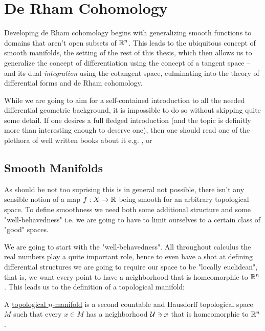 \chapter{De Rham Cohomology}
Developing de Rham cohomology begins with generalizing smooth functions to domains
that aren't open subsets of $\mathbb{R}^n$. This leads to the ubiquitous concept of smooth
manifolds, the setting of the rest of this thesis, which then allows us to generalize
the concept of differentiation using the concept of a tangent space – and its dual
\textit{integration} using the cotangent space, culminating into the theory of differential forms
and de Rham cohomology.

\begin{remark}
While we are going to aim for a self-contained introduction to all the needed differential geometric
background, it is impossible to do so without skipping quite some detail. If one desires a full fledged
introduction (and the topic is definitly more than interesting enough to deserve one), then one should read
one of the plethora of well written books about it e.g. \cite{lee_introduction_2013}, \cite{spivak_comprehensive_1979}
or \cite{wendl_differential_2022}
\end{remark}

\section{Smooth Manifolds}
As should be not too suprising this is in general not possible, there isn't any sensible notion
of a map $f: X \to \mathbb{R}$ being smooth for an arbitrary topological space. To define smoothness
we need both some additional structure and some "well-behavedness" i.e. we are going to have to
limit ourselves to a certain class of "good" spaces.

We are going to start with the "well-behavedness". All throughout calculus the real numbers play a
quite important role, hence to even have a shot at defining differential structures we are going
to require our space to be "locally euclidean", that is, we want every point to have a neighborhood that
is homeomorphic to $\mathbb{R}^n$. This leads us to the definition of a topological manifold:
\begin{definition}
A \underline{topological $n$-manifold} is a second countable and Hausdorff topological space $M$ such
that every $x \in M$ has a neighborhood $\mathcal{U} \ni x$ that is homeomorphic to $\mathbb{R}^n$.
\end{definition}


